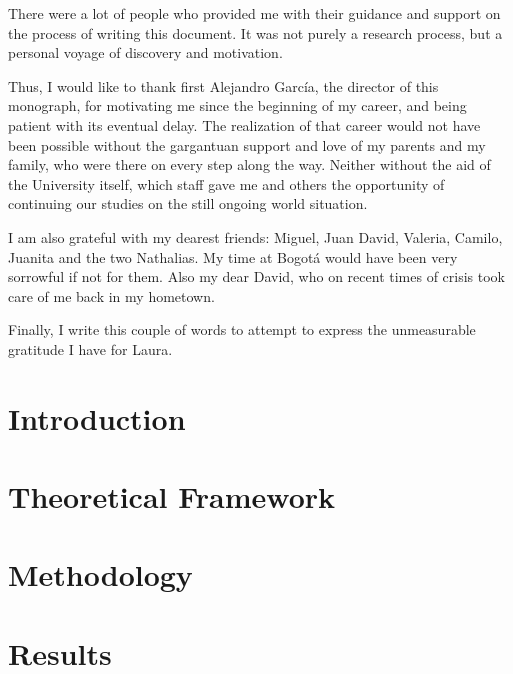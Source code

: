 \documentclass[12pt,letterpaper,oneside]{book}
\begin{document}
There were a lot of people who provided me with their guidance and support on the process of writing this document. 
It was not purely a research process, but a personal voyage of discovery and motivation. 

Thus, I would like to thank first Alejandro García, the director of this monograph, 
for motivating me since the beginning of my career, and being patient with its eventual delay. 
The realization of that career would not have been possible without the gargantuan support and love of my parents and my family, 
who were there on every step along the way.
Neither without the aid of the University itself, which staff gave me and others%
the opportunity of continuing our studies on the still ongoing world situation.

I am also grateful with my dearest friends: Miguel, Juan David, Valeria, Camilo, Juanita and the two Nathalias. 
My time at Bogotá would have been very sorrowful if not for them. 
Also my dear David, who on recent times of crisis took care of me back in my hometown.

Finally, I write this couple of words to attempt to express the unmeasurable gratitude I have for Laura.

\mainmatter

\tableofcontents

\newpage

\listoffigures
\listoftables
\listoflistings

\newpage

\visibleintenttrue

\chapter{Introduction}

	
\chapter{Theoretical Framework}


\chapter{Methodology}


\chapter{Results}

\end{document}
